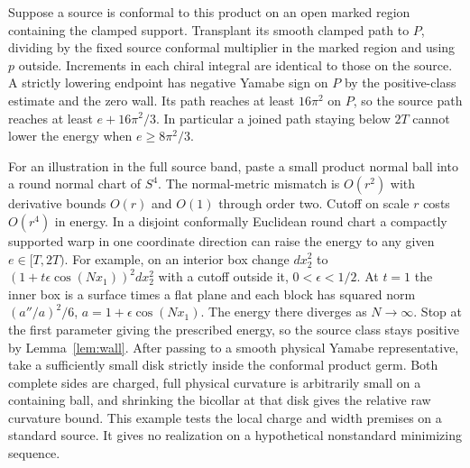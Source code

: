 Suppose a source is conformal to this product on an open
marked region containing the clamped support. Transplant its
smooth clamped path to \(P\), dividing by the fixed source
conformal multiplier in the marked region and using \(p\)
outside. Increments in each chiral integral are identical to
those on the source. A strictly lowering endpoint has negative
Yamabe sign on \(P\) by the positive-class estimate and the
zero wall. Its path reaches at least \(16\pi^2\) on \(P\),
so the source path reaches at least \(e+16\pi^2/3\).
In particular a joined path staying below \(2T\) cannot lower
the energy when \(e\ge8\pi^2/3\).

For an illustration in the full source band, paste a small
product normal ball into a round normal chart of \(S^4\).
The normal-metric mismatch is \(O(r^2)\) with derivative
bounds \(O(r)\) and \(O(1)\) through order two. Cutoff on
scale \(r\) costs \(O(r^4)\) in energy. In a disjoint
conformally Euclidean round chart a compactly supported warp
in one coordinate direction can raise the energy to any
given \(e\in[T,2T)\). For example, on an interior box change
\(dx_2^2\) to \((1+t\epsilon\cos(Nx_1))^2dx_2^2\) with a
cutoff outside it, \(0<\epsilon<1/2\). At \(t=1\) the inner
box is a surface times a flat plane and each block has
squared norm \((a''/a)^2/6\), \(a=1+\epsilon\cos(Nx_1)\).
The energy there diverges as \(N\to\infty\). Stop at the
first parameter giving the prescribed energy, so the source
class stays positive by Lemma~\ref{lem:wall}. After passing
to a smooth physical Yamabe representative, take a sufficiently
small disk strictly inside the conformal product germ. Both
complete sides are charged, full physical curvature is
arbitrarily small on a containing ball, and shrinking the
bicollar at that disk gives the relative raw curvature bound.
This example tests the local charge and width premises on a
standard source. It gives no realization on a hypothetical
nonstandard minimizing sequence.
